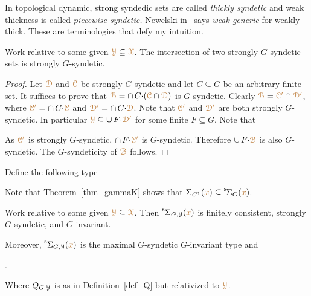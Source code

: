 \noindent\llap{\textcolor{red}{\Large\warning}\kern1.5ex}\ignorespaces
In topological dynamic, strong syndedic sets are called \textit{thickly syndetic\/} and weak thickness is called \textit{piecewise syndetic.}
Newelski in~\cite{Newelski09} says \textit{weak generic\/} for weakly thick.
These are terminologies that defy my intuition.

\begin{lemma}\label{lem_strongly_syndetic}
  Work relative to some given ${\color{brown}\EuScript Y}\subseteq{\color{brown}\EuScript X}$.
  The intersection of two strongly $G$-syndetic sets is strongly $G$-syndetic.
\end{lemma}

\begin{proof}
  Let ${\color{brown}\EuScript D}$ and ${\color{brown}\EuScript C}$ be strongly $G$-syndetic and let $C\subseteq G$ be an arbitrary finite set.
  It suffices to prove that ${\color{brown}\EuScript B}=\cap\, C{\cdot}({\color{brown}\EuScript C}\cap{\color{brown}\EuScript D})$ is $G$-syndetic. 
  Clearly ${\color{brown}\EuScript B}={\color{brown}\EuScript C'}\cap{\color{brown}\EuScript D'}$, where ${\color{brown}\EuScript C'}=\cap\, C{\cdot}{\color{brown}\EuScript C}$ and ${\color{brown}\EuScript D'}=\cap\, C{\cdot}{\color{brown}\EuScript D}$.
  Note that ${\color{brown}\EuScript C'}$ and ${\color{brown}\EuScript D'}$ are both strongly $G$-syndetic.
  In particular ${\color{brown}\EuScript Y}\subseteq\cup\,F{\cdot}\color{brown}\EuScript D'$ for some finite $F\subseteq G$.
  Note that
  
  
  
  
  As ${\color{brown}\EuScript C'}$ is strongly $G$-syndetic, $\cap\, F{\cdot}{\color{brown}\EuScript C'}$ is $G$-syndetic.
  Therefore $\cup\,F{\cdot}{\color{brown}\EuScript B}$ is also $G$-syndetic.
  The $G$-syndeticity of ${\color{brown}\EuScript B}$ follows.
\end{proof}

Define the following type

\smallskip

Note that Theorem~\ref{thm_gammaK} shows that $\Sigma_{G^1}({\color{brown} x})\subseteq{\mathstrut}^{\rm s}\kern-.2ex\Sigma_G({\color{brown} x})$.

\begin{corollary}\label{corol_str_gen}
  Work relative to some given ${\color{brown}\EuScript Y}\subseteq{\color{brown}\EuScript X}$.
  Then ${\mathstrut}^{\rm s}\kern-.1ex\Sigma_{G,\EuScript Y}({\color{brown} x})$ is finitely consistent, strongly $G$-syndetic, and $G$-invariant.\smallskip

  Moreover, ${\mathstrut}^{\rm s}\kern-.1ex\Sigma_{G,\EuScript Y}({\color{brown} x})$ is the maximal $G$-syndetic $G$-invariant type and\medskip


  .\smallskip

  Where $Q_{G,\EuScript Y}$ is as in Definition~\ref{def_Q} but relativized to ${\color{brown}\EuScript Y}$.  
\end{corollary}

